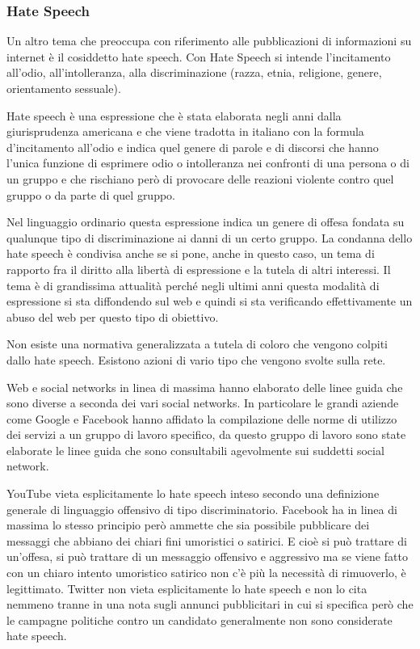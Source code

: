 \subsubsection{Hate Speech}
Un altro tema che preoccupa con riferimento alle pubblicazioni di informazioni su internet è il cosiddetto hate speech.
Con Hate Speech si intende l'incitamento all'odio, all'intolleranza, alla discriminazione (razza, etnia, religione, genere, orientamento sessuale).\par
Hate speech è una espressione che è stata elaborata negli anni dalla giurisprudenza americana e che viene tradotta in italiano con la formula d'incitamento all'odio e indica quel genere di parole e di discorsi che hanno l'unica funzione di esprimere odio o intolleranza nei confronti di una persona o di un gruppo e che rischiano però di provocare delle reazioni violente contro quel gruppo o da parte di quel gruppo.\par
Nel linguaggio ordinario questa espressione indica un genere di offesa fondata su qualunque tipo di discriminazione ai danni di un certo gruppo. La condanna dello hate speech è condivisa anche se si pone, anche in questo caso, un tema di rapporto fra il diritto alla libertà di espressione e la tutela di altri interessi. Il tema è di grandissima attualità perché negli ultimi anni questa modalità di espressione si sta diffondendo sul web e quindi si sta verificando effettivamente un abuso del web per questo tipo di obiettivo.\par
Non esiste una normativa generalizzata a tutela di coloro che vengono colpiti dallo hate speech. Esistono azioni di vario tipo che vengono svolte sulla rete. \par
Web e social networks in linea di massima hanno elaborato delle linee guida che sono diverse a seconda dei vari social networks. In particolare le grandi aziende come Google e Facebook hanno affidato la compilazione delle norme di utilizzo dei servizi a un gruppo di lavoro specifico, da questo gruppo di lavoro sono state elaborate le linee guida che sono consultabili agevolmente sui suddetti social network.\par
YouTube vieta esplicitamente lo hate speech inteso secondo una definizione generale di linguaggio offensivo di tipo discriminatorio. Facebook ha in linea di massima lo stesso principio però ammette che sia possibile pubblicare dei messaggi che abbiano dei chiari fini umoristici o satirici. E cioè si può trattare di un'offesa, si può trattare di un messaggio offensivo e aggressivo ma se viene fatto con un chiaro intento umoristico satirico non c'è più la necessità di rimuoverlo, è legittimato. Twitter non vieta esplicitamente lo hate speech e non lo cita nemmeno tranne in una nota sugli annunci pubblicitari in cui si specifica però che le campagne politiche contro un candidato generalmente non sono considerate hate speech.\par
